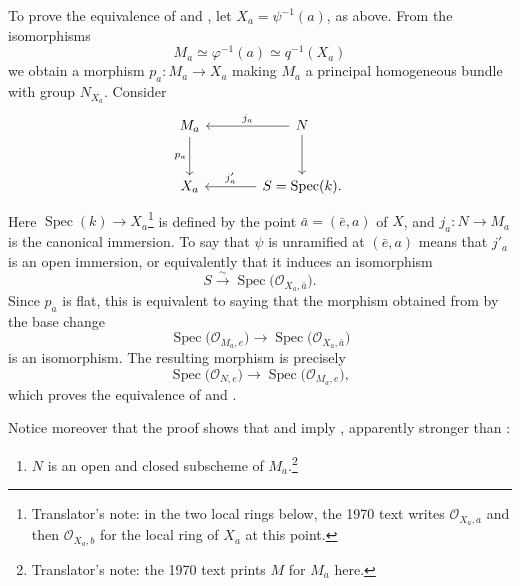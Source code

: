 To prove the equivalence of  and , let
\(X_a=\psi^{-1}(a)\), as above. From the isomorphisms
\[
  M_a\simeq\varphi^{-1}(a)\simeq q^{-1}(X_a)
\]
we obtain a morphism \(p_a:M_a\to X_a\) making \(M_a\) a principal
homogeneous bundle with group \(N_{X_a}\). Consider 
\[
\begin{tikzcd}[column sep=large,row sep=large]
M_a \arrow[d,"p_a"'] &
N \arrow[l,"j_a"'] \arrow[d] \\
X_a &
S=\operatorname{Spec}(k). \arrow[l,"j'_a"']
\end{tikzcd}
\]
Here \(\operatorname{Spec}(k)\to X_a\)\footnote{Translator's note: in
the two local rings below, the 1970 text writes \(\mathcal O_{X_a,a}\) and
then \(\mathcal O_{X_a,b}\) for the local ring of \(X_a\) at this point.} is defined by the point
\(\bar a=(\bar e,a)\) of \(X\), and \(j_a:N\to M_a\) is the canonical
immersion. To say that \(\psi\) is unramified at \((\bar e,a)\) means
that \(j'_a\) is an open immersion, or equivalently that it induces an
isomorphism
\[
  S\xrightarrow{\sim}\operatorname{Spec}
  \bigl(\mathcal O_{X_a,\bar a}\bigr).
\]
Since \(p_a\) is flat, this is equivalent to saying that the morphism
obtained from  by the base change
\[
  \operatorname{Spec}\bigl(\mathcal O_{M_a,e}\bigr)
  \longrightarrow
  \operatorname{Spec}\bigl(\mathcal O_{X_a,\bar a}\bigr)
\]
is an isomorphism. The resulting morphism is precisely
\[
  \operatorname{Spec}\bigl(\mathcal O_{N,e}\bigr)
  \longrightarrow
  \operatorname{Spec}\bigl(\mathcal O_{M_a,e}\bigr),
\]
which proves the equivalence of  and .

Notice moreover that the proof shows that  and  imply , apparently stronger than :
\begin{enumerate}
\item[(iii bis)] 
  \(N\) is an open and closed subscheme of
  \(M_a\).\footnote{Translator's note: the 1970 text prints \(M\) for
  \(M_a\) here.}
\end{enumerate}

